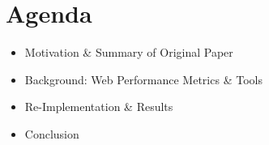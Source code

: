 \section{Agenda}

\begin{frame}
    \begin{itemize}
        \item Motivation \& Summary of Original Paper
        \item Background: Web Performance Metrics \& Tools
        \item Re-Implementation \& Results
        \item Conclusion
    \end{itemize}
\end{frame}
